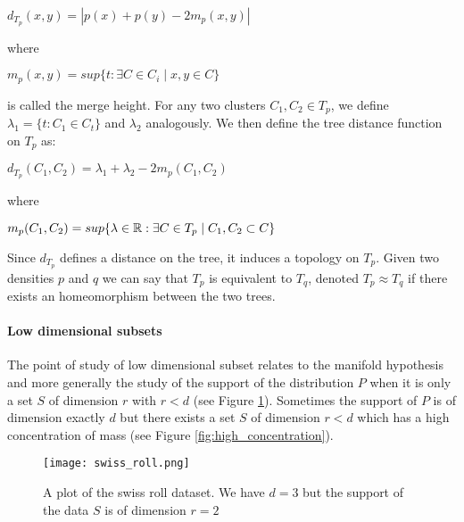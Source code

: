\documentclass[12pt, a4paper]{article}
\begin{document}
  \begin{center}
    $d_{T_p}(x,y) = |p(x) + p(y) - 2m_p(x,y)|$
  \end{center}

  where

  \begin{center}
    $m_p(x,y) = sup \lbrace t : \exists C\in C_i \mid x,y \in C \rbrace$    
  \end{center}
  
  is called the merge height. For any two clusters $C_1, C_2 \in T_p$, we define $\lambda_1 = \lbrace t: C_1 \in C_t \rbrace$ and $\lambda_2$ analogously. We then define the tree distance function on $T_p$ as:

  \begin{center}
    $d_{T_p}(C_1,C_2) = \lambda_1 + \lambda_2 - 2m_p(C_1,C_2)$
  \end{center}

  where

  \begin{center}
    $m_p(C_1,C_2) = sup \lbrace \lambda \in \mathbb{R} : \exists C \in T_p \mid C_1, C_2 \subset C \rbrace$
  \end{center}

  Since $d_{T_p}$ defines a distance on the tree, it induces a topology on $T_p$. Given two densities $p$ and $q$ we can say that $T_p$ is equivalent to $T_q$, denoted $T_p \approx T_q$ if there exists an homeomorphism between the two trees.

\paragraph{Low dimensional subsets}

The point of study of low dimensional subset relates to the manifold hypothesis and more generally the study of the support of the distribution $P$ when it is only a set $S$ of dimension $r$ with $r < d$ (see Figure \ref{fig:swiss_roll}). Sometimes the support of $P$ is of dimension exactly $d$ but there exists a set $S$ of dimension $r < d$ which has a high concentration of mass (see Figure \ref{fig:high_concentration}).\\  

  \begin{figure}[p]
    \centering
  \texttt{[image: swiss\_roll.png]}
  \caption{A plot of the swiss roll dataset. We have $d=3$ but the support of the data $S$ is of dimension $r=2$}
  \label{fig:swiss_roll}
\end{figure}
  
\end{document}
